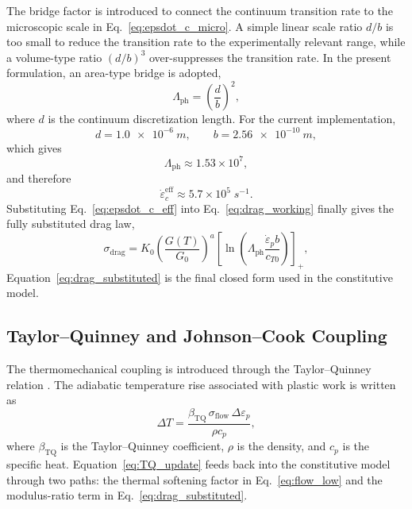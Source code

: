 The bridge factor is introduced to connect the continuum transition rate to the microscopic scale in Eq.~\eqref{eq:epsdot_c_micro}. A simple linear scale ratio $d/b$ is too small to reduce the transition rate to the experimentally relevant range, while a volume-type ratio $(d/b)^3$ over-suppresses the transition rate. In the present formulation, an area-type bridge is adopted,
\begin{equation}
\Lambda_{\mathrm{ph}} = \left(\frac{d}{b}\right)^2,
\label{eq:Lambda_ph_scale_ratio}
\end{equation}
where $d$ is the continuum discretization length. For the current implementation,
\begin{equation}
d = \SI{1.0e-6}{m}, \qquad b = \SI{2.56e-10}{m},
\label{eq:d_and_b_values}
\end{equation}
which gives
\begin{equation}
\Lambda_{\mathrm{ph}} \approx 1.53\times10^7,
\label{eq:Lambda_value}
\end{equation}
and therefore
\begin{equation}
\dot{\varepsilon}^{\mathrm{eff}}_c \approx 5.7\times10^5\;s^{-1}.
\label{eq:epsdot_c_value}
\end{equation}
Substituting Eq.~\eqref{eq:epsdot_c_eff} into Eq.~\eqref{eq:drag_working} finally gives the fully substituted drag law,
\begin{equation}
\sigma_{\mathrm{drag}}=
K_0
\left(\frac{G(T)}{G_0}\right)^a
\left[
\ln\left(\Lambda_{\mathrm{ph}}\frac{\dot{\varepsilon}_p b}{c_{T0}}\right)
\right]_+
\!,
\label{eq:drag_substituted}
\end{equation}
Equation~\eqref{eq:drag_substituted} is the final closed form used in the constitutive model.

\subsection{Taylor--Quinney and Johnson--Cook Coupling}
The thermomechanical coupling is introduced through the Taylor--Quinney relation \cite{TaylorQuinney1934,Rittel2019}. The adiabatic temperature rise associated with plastic work is written as
\begin{equation}
\Delta T = \frac{\beta_{\mathrm{TQ}}\,\sigma_{\mathrm{flow}}\,\Delta\varepsilon_p}{\rho c_p},
\label{eq:TQ_update}
\end{equation}
where $\beta_{\mathrm{TQ}}$ is the Taylor--Quinney coefficient, $\rho$ is the density, and $c_p$ is the specific heat. Equation~\eqref{eq:TQ_update} feeds back into the constitutive model through two paths: the thermal softening factor in Eq.~\eqref{eq:flow_low} and the modulus-ratio term in Eq.~\eqref{eq:drag_substituted}.

